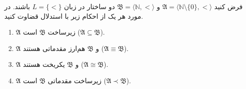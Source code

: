 فرض کنید $\mathfrak{A} = \langle \mathbb{N} \setminus \{ 0 \}, < \rangle$ و $\mathfrak{B} = \langle \mathbb{N}, < \rangle$ دو ساختار در زبان $L = \{ < \}$ باشند. در مورد هر یک از احکام زیر با استدلال قضاوت کنید.
\begin{enumerate}[label=(\alph*)]
  \item $\mathfrak{A}$ زیرساخت $\mathfrak{B}$ است ($\mathfrak{A} \subseteq \mathfrak{B}$).
  \item $\mathfrak{A}$ و $\mathfrak{B}$ هم‌ارز مقدماتی هستند ($\mathfrak{A} \equiv \mathfrak{B}$).
  \item $\mathfrak{A}$ و $\mathfrak{B}$ یکریخت هستند ($\mathfrak{A} \cong \mathfrak{B}$).
  \item $\mathfrak{A}$ زیرساخت مقدماتی $\mathfrak{B}$ است ($\mathfrak{A} \prec \mathfrak{B}$).
\end{enumerate}